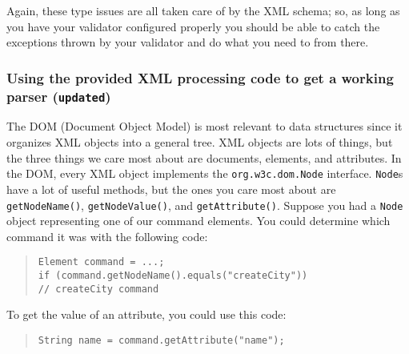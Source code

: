 \documentclass[12pt]{article}
\begin{document}

Again, these type issues are all taken care of by the XML schema; so,
 as long as you have your validator configured properly you should be able to catch the exceptions thrown by your validator and do what you need to from there.

\subsubsection{Using the provided XML processing code to get a working
  parser  (\texttt{updated})}

The DOM (Document Object Model) is most relevant to data
structures since it organizes XML objects into a general tree.  XML
objects are lots of things, but the three things we care most about
are documents, elements, and attributes.  In the DOM, every XML object
implements the \texttt{org.w3c.dom.Node} interface.  \texttt{Node}s
have a lot of useful methods, but the ones you care most about are
\texttt{getNodeName()}, \texttt{getNodeValue()}, and
\texttt{getAttribute()}.  Suppose you had a \texttt{Node} object
representing one of our command elements.  You could determine which
command it was with the following code:
\begin{quote}
\begin{verbatim}
Element command = ...;
if (command.getNodeName().equals("createCity"))
// createCity command
\end{verbatim}
\end{quote}
To get the value of an attribute, you could use this code:
\begin{quote}
\begin{verbatim}
String name = command.getAttribute("name");
\end{verbatim}
\end{quote}
\end{document}
